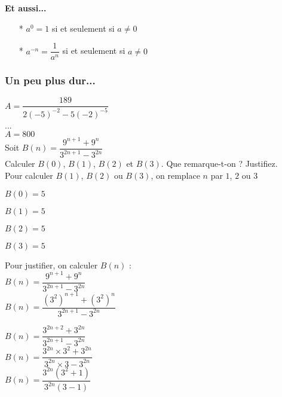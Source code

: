 \textbf{Et aussi...}

\begin{itemize}

\item[*] $ a^0 = 1 $ si et seulement si $ a \neq 0 $ \\

\item[*] $ a^{-n} = \dfrac{1}{a^n} $ si et seulement si $ a \neq 0 $ \\

\end{itemize}

\newpage
\subsubsection{Un peu plus dur...}

$ A = \dfrac{189}{2\left(-5\right)^{-2}-5\left(-2\right)^{-5}} $ \\

... \\

$ A = 800 $ \\

Soit $ B(n) = \dfrac{9^{n+1} + 9^n}{3^{2n+1} - 3^{2n}} $ \\

Calculer $ B(0) $, $ B(1) $, $ B(2)$ et $ B(3) $. Que remarque-t-on ? Justifiez. \\

Pour calculer $ B(1)$, $B(2)$ ou $ B(3)$, on remplace $n$ par $ 1 $, $2$ ou $3$

$ B(0) = 5 $ 

$ B(1) = 5 $

$ B(2) = 5 $

$ B(3) = 5 $

Pour justifier, on calculer $ B(n) $ : \\

$ B(n) = \dfrac{9^{n+1} + 9^n}{3^{2n+1} - 3^{2n}} $ \\

$ B(n) = \dfrac{\left(3^2\right)^{n+1} + \left(3^2\right)^n}{3^{2n+1} - 3^{2n}} $

$ B(n) = \dfrac{3^{2n+2} + 3^{2n}}{3^{2n+1} - 3^{2n}} $ \\

$ B(n) = \dfrac{3^{2n} \times 3^2 + 3^{2n}}{3^{2n} \times 3 - 3^{2n}} $ \\

$ B(n) = \dfrac{3^{2n}\left(3^{2} + 1\right)}{3^{2n}\left(3-1\right)} $ \\

